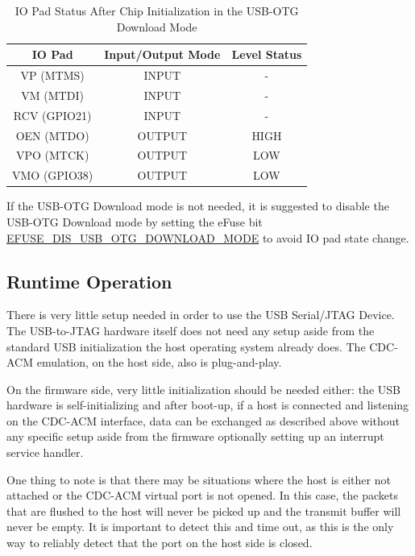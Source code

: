 \documentclass[main\_\_EN.tex]{subfiles}
\begin{document}
\begin{table}[H]
    \centering
    \caption{IO Pad Status After Chip Initialization in the USB-OTG Download Mode}
    \label{tab:io-pad-state-in-usb-otg-download-mode}
    \begin{tabular}{|c|c|c|}
    \hline
       \rowcolor{lightgray}
       \textbf{IO Pad} & \textbf{Input/Output Mode} & \textbf{Level Status} \\\hline
        VP (MTMS) & INPUT & - \\\hline
        VM (MTDI) & INPUT & - \\\hline
        RCV (GPIO21) & INPUT & - \\\hline
        OEN (MTDO) & OUTPUT & HIGH \\\hline
        VPO (MTCK) & OUTPUT & LOW \\\hline
        VMO (GPIO38) & OUTPUT & LOW \\\hline
    \end{tabular}
\end{table}

If the USB-OTG Download mode is not needed, it is suggested to disable the USB-OTG Download mode by setting the eFuse bit \hyperref[fielddesc:EFUSEDISUSBOTGDOWNLOADMODE]{EFUSE\_DIS\_USB\_OTG\_DOWNLOAD\_MODE} to avoid IO pad state change.


\subsection{Runtime Operation}

There is very little setup needed in order to use the USB Serial/JTAG Device. The USB-to-JTAG hardware itself does not need any setup aside from the standard USB initialization the host operating system already does. The CDC-ACM emulation, on the host side, also is plug-and-play.

On the firmware side, very little initialization should be needed either: the USB hardware is self-initializing and after boot-up, if a host is connected and listening on the CDC-ACM interface, data can be exchanged as described above without any specific setup aside from the firmware optionally setting up an interrupt service handler.

One thing to note is that there may be situations where the host is either not attached or the CDC-ACM virtual port is not opened. In this case, the packets that are flushed to the host will never be picked up and the transmit buffer will never be empty. It is important to detect this and time out, as this is the only way to reliably detect that the port on the host side is closed.
\end{document}
